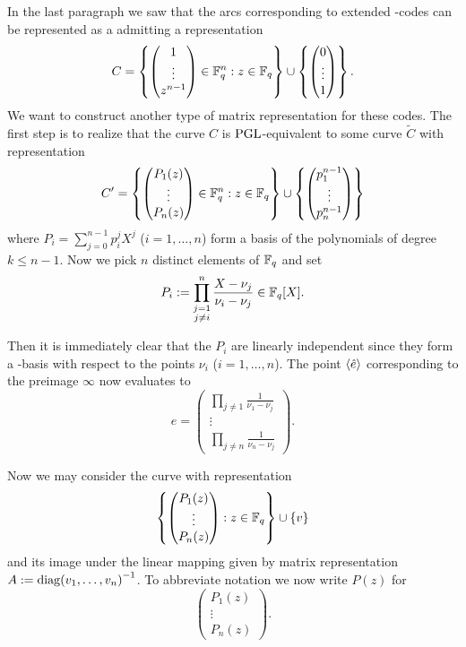 In the last paragraph we saw that the arcs corresponding to extended -codes can be represented as a  admitting a representation
$$ C = \left\{\begin{pmatrix} 1 \\
            \vdots            \\
            z^{n-1}\end{pmatrix}\in\mathbb{F}_{q}^n:z\in \mathbb{F}_{q}\right\}\cup
    \left\{\begin{pmatrix} 0    \\
            \vdots            \\
            1\end{pmatrix}\right\}\textrm{.} $$
We want to construct another type of matrix representation for these codes.
The first step is to realize that the curve $C$ is $\mathrm{PGL}$-equivalent to some curve $\tilde{C}$ with representation
$$ C' = \left\{
    \begin{pmatrix} P_1(z)             \\
        \vdots                         \\
        P_n(z)\end{pmatrix}\in\mathbb{F}_{q}^n:z\in \mathbb{F}_{q}\right\}
\cup\left\{\begin{pmatrix} p_1^{n-1} \\
        \vdots                         \\
        p_n^{n-1}\end{pmatrix}\right\} $$
where $P_i=\sum_{j=0}^{n-1}{p_i^j X^j}$ ($i=1,\ldots,n$) form a basis of the polynomials of degree $k\leq n-1$. Now we pick $n$ distinct elements of $\mathbb{F}_{q}$ and set
$$ P_i := \prod_{\substack{j=1\\ j\neq i}}^n{\frac{X-\nu_j}{\nu_i-\nu_j}}\in\mathbb{F}_{q}[X]\textrm{.} $$

Then it is immediately clear that the $P_i$ are linearly independent since they form a -basis with respect to the points $\nu_i$ ($i=1,\ldots,n$). The point $\gen{\hat{e}}$ corresponding to the preimage $\infty$ now evaluates to
$$ e = 
    \begin{pmatrix}
        \prod\limits_{j\neq 1}{\frac{1}{\nu_1-\nu_j}}\\
        \vdots               \\
        \prod\limits_{j\neq n}{\frac{1}{\nu_n-\nu_j}}
    \end{pmatrix}\textrm{.} $$

Now we may consider the curve with representation
$$ \left\{\begin{pmatrix} P_1(z)\\ \vdots\\ P_n(z)\end{pmatrix}:z\in\mathbb{F}_{q}\right\}\cup\left\{v\right\} $$
and its image under the linear mapping given by matrix representation $A:={\mathop\mathrm{diag}(v_1,\ldots,v_n)}^{-1}$.
To abbreviate notation we now write $P(z)$ for
$$ \begin{pmatrix} P_1(z)\\ \vdots\\ P_n(z)\end{pmatrix}\textrm{.} $$

